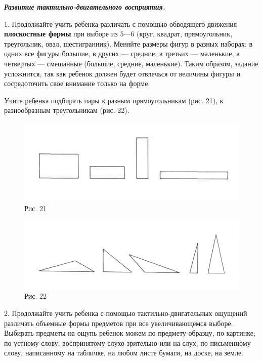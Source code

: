 \documentclass[a5paper]{book}
\renewcommand{\emph}[1]{\textit{#1}}
\begin{document}
\emph{\textbf{Развитие тактильно-двигательного восприятия.}}

1. Продолжайте учить ребенка различать с помощью обводящего движения
\textbf{плоскостные формы} при выборе из 5---6 (круг, квадрат,
прямоугольник, треугольник, овал, шестигранник). Меняйте размеры фигур в
разных наборах: в одних все фигуры большие, в других --- средние, в
третьих --- маленькие, в четвертых --- смешанные (большие, средние,
маленькие). Таким образом, задание усложнится, так как ребенок должен
будет отвлечься от величины фигуры и сосредоточить свое внимание только
на форме.

Учите ребенка подбирать пары к разным прямоугольникам (рис. 21), к
разнообразным треугольникам (рис. 22).

\begin{figure}
\centering
\includegraphics[width=\linewidth]{media/media/image18.png}
\caption*{Рис. 21}
\end{figure}


\begin{figure}
\centering
\includegraphics[width=\linewidth]{media/media/image19.png}
\caption*{Рис. 22}
\end{figure}


2. Продолжайте учить ребенка с помощью тактильно-двигательных ощущений
различать объемные формы предметов при все увеличивающемся выборе.
Выбирать предметы на ощупь ребенок можем по предмету-образцу, по
картинке; по устному слову, воспринятому слухо-зрительно или на слух; по
письменному слову, написанному на табличке, на любом листе бумаги, на
доске, на земле.
\end{document}
